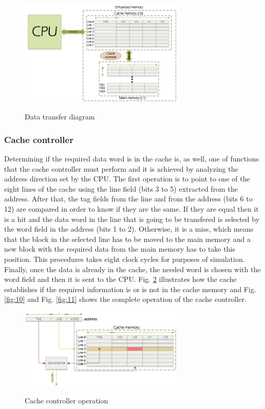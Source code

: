 \documentclass[]{article}
\begin{document}
\begin{figure}[H]
	\caption{Data transfer diagram}
	\centering
	\includegraphics[width=0.7\textwidth]{cpu_memory}
	\label{fig:8}
\end{figure}

\subsubsection{Cache controller}

Determining if the required data word is in the cache is, as well, one of functions that the cache controller must perform and it is achieved by analyzing the address direction set by the CPU. The first operation is to point to one of the eight lines of the cache using the line field (bits 3 to 5) extracted from the address. After that, the tag fields from the line and from the address (bits 6 to 12) are compared in order to know if they are the same. If they are equal then it is a hit and the data word in the line that is going to be transfered is selected by the word field in the address (bits 1 to 2). Otherwise, it is a miss, which means that the block in the selected line has to be moved to the main memory and a new block with the required data from the main memory has to take this position. This procedures takes eight clock cycles for purposes of simulation. Finally, once the data is already in the cache, the needed word is chosen with the word field and then it is sent to the CPU. Fig. \ref{fig:9} illustrates how the cache establishes if the required information is or is not in the cache memory and Fig. \ref{fig:10} and Fig. \ref{fig:11} shows the complete operation of the cache controller.

\begin{figure}[H]
	\caption{Cache controller operation}
	\centering
	\includegraphics[width=0.7\textwidth]{Direct_mapping}
	\label{fig:9}
\end{figure}
\end{document}

